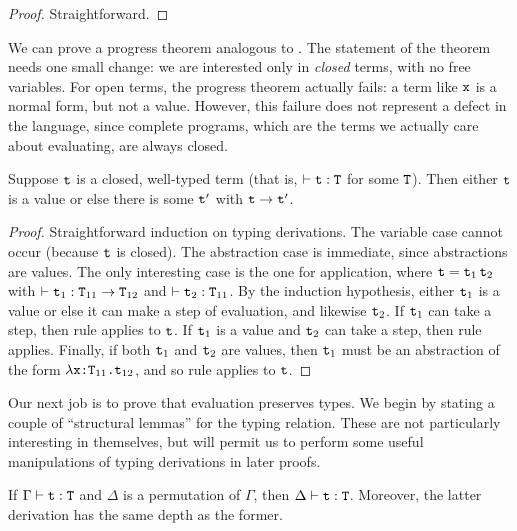 \documentclass[11pt,twoside=off,numbers=noenddot]{scrbook}
\begin{document}
\begin{proof}
  Straightforward.
\end{proof}

We can prove a progress theorem analogous to
. The statement of
the theorem needs one small change: we are interested only in
\textit{closed} terms, with no free variables. For open terms, the
progress theorem actually fails: a term like $\texttt{x}$ is a normal
form, but not a value. However, this failure does not represent a
defect in the language, since complete programs, which are the terms
we actually care about evaluating, are always closed.

\begin{theorem}[Progress]
  Suppose $\texttt{t}$ is a closed, well-typed term (that is, $\vdash
  \texttt{t} : \texttt{T}$ for some $\texttt{T}$). Then either $\texttt{t}$ is a
  value or else there is some $\texttt{t}'$ with $\texttt{t} \rightarrow \texttt{t}'$.
\end{theorem}

\begin{proof}
  Straightforward induction on typing derivations. The variable case
  cannot occur (because $\texttt{t}$ is closed). The abstraction case is
  immediate, since abstractions are values. The only interesting case
  is the one for application, where $\texttt{t} = \texttt{$\texttt{t}_1$\,$\texttt{t}_2$}$
  with $\vdash \texttt{t}_1 :
  \texttt{$\texttt{T}_{11}\rightarrow\texttt{T}_{12}$}$ and $\vdash \texttt{t}_2
  : \texttt{T}_{11}$. By the induction hypothesis, either $\texttt{t}_1$ is
  a value or else it can make a step of evaluation, and likewise
  $\texttt{t}_2$. If $\texttt{t}_1$ can take a step, then rule 
  applies to $\texttt{t}$. If $\texttt{t}_1$ is a value and $\texttt{t}_2$ can
  take a step, then rule  applies. Finally, if both
  $\texttt{t}_1$ and $\texttt{t}_2$ are values, then $\texttt{t}_1$ must be an
  abstraction of the form
  $\texttt{$\lambda$x:$\texttt{T}_{11}$.$\texttt{t}_{12}$}$, and so rule
   applies to $\texttt{t}$.
\end{proof}

Our next job is to prove that evaluation preserves types. We begin by
stating a couple of ``structural lemmas'' for the typing relation.
These are not particularly interesting in themselves, but will permit
us to perform some useful manipulations of typing derivations in later proofs.

\begin{lemma}[Permutation]
  If $\Gamma \vdash \texttt{t} : \texttt{T}$ and $\Delta$ is a permutation of
  $\Gamma$, then $\Delta \vdash \texttt{t} : \texttt{T}$. Moreover, the
  latter derivation has the same depth as the former.
\end{lemma}
\end{document}

